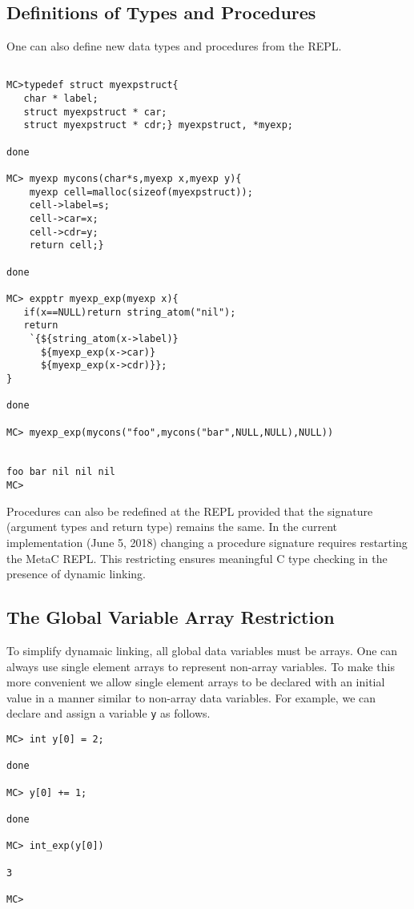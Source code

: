 \documentclass{article}
\begin{document}
\subsection{Definitions of Types and Procedures}

One can also define new data types and procedures from the REPL.

\begin{verbatim}

MC>typedef struct myexpstruct{
   char * label;
   struct myexpstruct * car;
   struct myexpstruct * cdr;} myexpstruct, *myexp;

done

MC> myexp mycons(char*s,myexp x,myexp y){
    myexp cell=malloc(sizeof(myexpstruct));
    cell->label=s;
    cell->car=x;
    cell->cdr=y;
    return cell;}

done

MC> expptr myexp_exp(myexp x){
   if(x==NULL)return string_atom("nil");
   return
    `{${string_atom(x->label)}
      ${myexp_exp(x->car)}
      ${myexp_exp(x->cdr)}};
}

done

MC> myexp_exp(mycons("foo",mycons("bar",NULL,NULL),NULL))


foo bar nil nil nil
MC>
\end{verbatim}

Procedures can also be redefined at the REPL provided that the
signature (argument types and return type) remains the same.  In the
current implementation (June 5, 2018) changing a procedure signature
requires restarting the MetaC REPL.  This restricting ensures
meaningful C type checking in the presence of dynamic linking.

\subsection{The Global Variable Array Restriction}

To simplify dynamaic linking, all global data
variables must be arrays. One can always use single element
arrays to represent non-array variables.  To make this more convenient
we allow single element arrays to be declared with an initial value in a
manner similar to non-array data variables.  For example, we can declare and assign a variable {\tt y}
as follows.

\begin{verbatim}
MC> int y[0] = 2;

done

MC> y[0] += 1;

done

MC> int_exp(y[0])

3

MC>
\end{verbatim}
\end{document}
